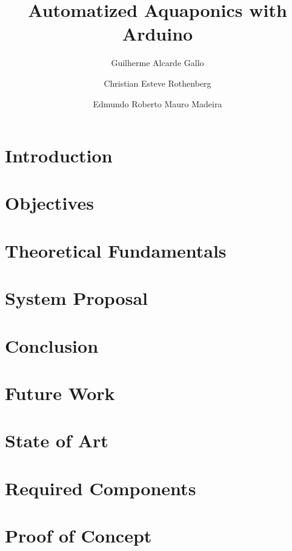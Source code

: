 \documentclass[10pt,a4paper]{article}
\title{Automatized Aquaponics with Arduino}
\author{Guilherme Alcarde Gallo \and Christian Esteve Rothenberg \and Edmundo Roberto Mauro Madeira}
\begin{document}
\maketitle

\newpage

\section{Introduction}
\label{sec:introduction}


\section{Objectives}
\label{objectives}


\section{Theoretical Fundamentals}
\label{fundamentals}


\section{System Proposal}
\label{proposal}


\section{Conclusion}
\label{conclusion}


\section{Future Work}
\label{future}


\section{State of Art}
\label{sec:state_of_art}



\section{Required Components}
\label{sec:required_components}



\section{Proof of Concept}
\label{sec:proof_of_concept}


\end{document}
